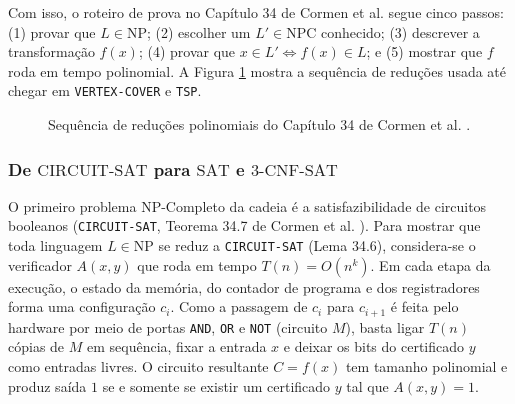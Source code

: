 \documentclass[conference]{IEEEtran}
\theoremstyle{definition}
\theoremstyle{plain}
\begin{document}
Com isso, o roteiro de prova no Capítulo 34 de Cormen et al. \cite{cormen2012algoritmos} segue cinco passos: (1) provar que $L \in \text{NP}$; (2) escolher um $L' \in \text{NPC}$ conhecido; (3) descrever a transformação $f(x)$; (4) provar que $x \in L' \iff f(x) \in L$; e (5) mostrar que $f$ roda em tempo polinomial. A Figura \ref{fig:cadeia_cormen} mostra a sequência de reduções usada até chegar em \texttt{VERTEX-COVER} e \texttt{TSP}.

\begin{figure}[htbp]
\centering
{}
\caption{Sequência de reduções polinomiais do Capítulo 34 de Cormen et al. \cite{cormen2012algoritmos}.}
\label{fig:cadeia_cormen}
\end{figure}

\subsubsection{De $\text{CIRCUIT-SAT}$ para $\text{SAT}$ e $\text{3-CNF-SAT}$}

O primeiro problema NP-Completo da cadeia é a satisfazibilidade de circuitos booleanos (\texttt{CIRCUIT-SAT}, Teorema 34.7 de Cormen et al. \cite{cormen2012algoritmos}). Para mostrar que toda linguagem $L \in \text{NP}$ se reduz a \texttt{CIRCUIT-SAT} (Lema 34.6), considera-se o verificador $A(x, y)$ que roda em tempo $T(n) = O(n^k)$. Em cada etapa da execução, o estado da memória, do contador de programa e dos registradores forma uma configuração $c_i$. Como a passagem de $c_i$ para $c_{i+1}$ é feita pelo hardware por meio de portas \texttt{AND}, \texttt{OR} e \texttt{NOT} (circuito $M$), basta ligar $T(n)$ cópias de $M$ em sequência, fixar a entrada $x$ e deixar os bits do certificado $y$ como entradas livres. O circuito resultante $C = f(x)$ tem tamanho polinomial e produz saída $1$ se e somente se existir um certificado $y$ tal que $A(x, y) = 1$.
\end{document}
